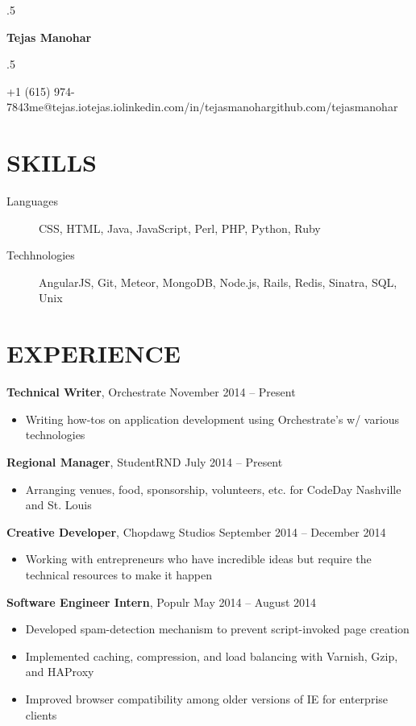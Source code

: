 \documentclass{res}
\newcommand*{\its}{\hspace{0.8cm}}
\begin{document}
\moveleft.5\hoffset\centerline{\Huge\bf Tejas Manohar}
\bigskip
\moveleft.5\hoffset\centerline{+1 (615) 974-7843\its{}me@tejas.io\its{}\its{}tejas.io\its{}linkedin.com/in/tejasmanohar\its{}github.com/tejasmanohar}

\section{SKILLS}

\begin{description}
  \item[Languages] CSS, HTML, Java, JavaScript, Perl, PHP, Python, Ruby
  \item[Techhnologies] AngularJS, Git, Meteor, MongoDB, Node.js, Rails, Redis, Sinatra, SQL, Unix
\end{description}

\section{EXPERIENCE}

{\bf Technical Writer}, Orchestrate \hfill November 2014 -- Present
\begin{itemize} \itemsep -2pt
  \item Writing how-tos on application development using Orchestrate's w/ various technologies
\end{itemize}

{\bf Regional Manager}, StudentRND \hfill July 2014 -- Present
\begin{itemize} \itemsep -2pt
  \item Arranging venues, food, sponsorship, volunteers, etc. for CodeDay Nashville and St. Louis
\end{itemize}

{\bf Creative Developer}, Chopdawg Studios \hfill September 2014 -- December 2014
\begin{itemize} \itemsep -2pt
  \item Working with entrepreneurs who have incredible ideas but require the technical resources to make it happen
\end{itemize}

{\bf Software Engineer Intern}, Populr \hfill May 2014 -- August 2014
\begin{itemize} \itemsep -2pt
  \item Developed spam-detection mechanism to prevent script-invoked page creation
  \item Implemented caching, compression, and load balancing with Varnish, Gzip, and HAProxy
  \item Improved browser compatibility among older versions of IE for enterprise clients
\end{itemize}
\end{document}
